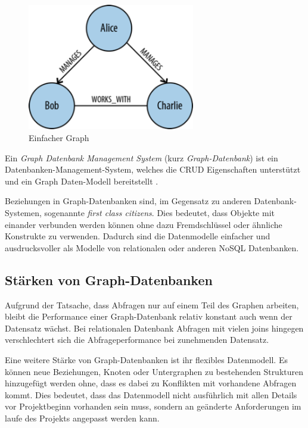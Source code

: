 \begin{figure}[h]
    \myfloatalign
    \includegraphics[width=0.65\textwidth]{gfx/simple_graph.png}
    \caption{Einfacher Graph \cite{neo4jblog:graph}}
    \label{fig:simple_graph}
\end{figure}

Ein \emph{Graph Datenbank Management System} (kurz \emph{Graph-Datenbank}) ist ein Datenbanken-Management-System, welches die \ac{CRUD} Eigenschaften unterstützt und ein Graph Daten-Modell bereitstellt \cite{robinsongraph:2015}.

Beziehungen in Graph-Datenbanken sind, im Gegensatz zu anderen Datenbank-Systemen, sogenannte \emph{first class citizens}. Dies bedeutet, dass Objekte mit einander verbunden werden können ohne dazu Fremdschlüssel oder ähnliche Konstrukte zu verwenden. Dadurch sind die Datenmodelle einfacher und ausdrucksvoller als Modelle von relationalen oder anderen \ac{NoSQL} Datenbanken. \cite{robinsongraph:2015} 

\subsection{Stärken von Graph-Datenbanken}
Aufgrund der Tatsache, dass Abfragen nur auf einem Teil des Graphen arbeiten, bleibt die Performance einer Graph-Datenbank relativ konstant auch wenn der Datensatz wächst. Bei relationalen Datenbank Abfragen mit vielen joins hingegen verschlechtert sich die Abfrageperformance bei zunehmenden Datensatz. \cite{robinsongraph:2015}

Eine weitere Stärke von Graph-Datenbanken ist ihr flexibles Datenmodell. Es können neue Beziehungen, Knoten oder Untergraphen zu bestehenden Strukturen hinzugefügt werden ohne, dass es dabei zu Konflikten mit vorhandene Abfragen kommt. Dies bedeutet, dass das Datenmodell nicht ausführlich mit allen Details vor Projektbeginn vorhanden sein muss, sondern an geänderte Anforderungen im laufe des Projekts angepasst werden kann. \cite{robinsongraph:2015}
